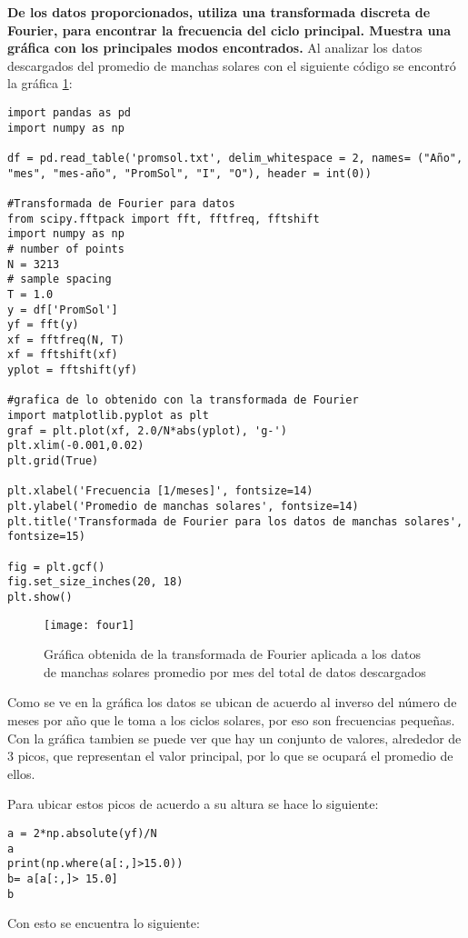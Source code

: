 \textbf{De los datos proporcionados, utiliza una transformada discreta de Fourier, para encontrar la frecuencia del ciclo principal. Muestra una gráfica con los principales modos encontrados.}
Al analizar los datos descargados del promedio de manchas solares con el siguiente código se encontró la gráfica \ref{fsol1}:
\begin{verbatim}
import pandas as pd
import numpy as np

df = pd.read_table('promsol.txt', delim_whitespace = 2, names= ("Año", "mes", "mes-año", "PromSol", "I", "O"), header = int(0)) 

#Transformada de Fourier para datos 
from scipy.fftpack import fft, fftfreq, fftshift
import numpy as np
# number of points
N = 3213
# sample spacing
T = 1.0
y = df['PromSol']
yf = fft(y)
xf = fftfreq(N, T)
xf = fftshift(xf)
yplot = fftshift(yf)

#grafica de lo obtenido con la transformada de Fourier
import matplotlib.pyplot as plt
graf = plt.plot(xf, 2.0/N*abs(yplot), 'g-')
plt.xlim(-0.001,0.02)
plt.grid(True)

plt.xlabel('Frecuencia [1/meses]', fontsize=14)
plt.ylabel('Promedio de manchas solares', fontsize=14)
plt.title('Transformada de Fourier para los datos de manchas solares', fontsize=15)

fig = plt.gcf()
fig.set_size_inches(20, 18)
plt.show()
\end{verbatim}

\begin{figure}
\centering
\texttt{[image: four1]}
\caption{Gráfica obtenida de la transformada de Fourier aplicada a los datos de manchas solares promedio por mes del total de datos descargados}
\label{fsol1}
\end{figure}

Como se ve en la gráfica los datos se ubican de acuerdo al inverso del número de meses por año que le toma a los ciclos solares, por eso son frecuencias pequeñas. Con la gráfica tambien se puede ver que hay un conjunto de valores, alrededor de 3 picos, que representan el valor principal, por lo que se ocupará el promedio de ellos.

Para ubicar estos picos de acuerdo a su altura se hace lo siguiente:
\begin{verbatim}
a = 2*np.absolute(yf)/N
a
print(np.where(a[:,]>15.0))
b= a[a[:,]> 15.0]
b
\end{verbatim}
Con esto se encuentra lo siguiente:

